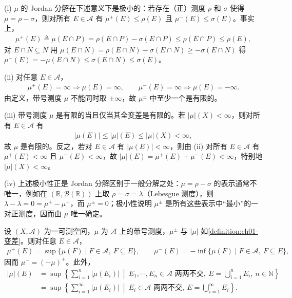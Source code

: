 \documentclass[../../main.tex]{subfiles}%
\begin{document}
\begin{remark}\label{remark:ch01-Jordan性质}\label{remark:ch01-Jordan变差}
(i) $\mu$ 的 Jordan 分解在下述意义下是极小的：若存在（正）测度 $\rho$ 和 $\sigma$ 使得 $\mu=\rho-\sigma$，则对所有 $E\in\mathcal{A}$ 有 $\mu^+(E)\leqslant\rho(E)$ 且 $\mu^-(E)\leqslant\sigma(E)$。事实上，
\begin{align*}
\mu^+(E)\triangleq\mu(E\cap P)=\rho(E\cap P)-\sigma(E\cap P)\leqslant\rho(E\cap P)\leqslant\rho(E),
\end{align*}
对 $E\cap N\subseteq N$ 用 $\mu(E\cap N)=\rho(E\cap N)-\sigma(E\cap N)\geqslant-\sigma(E\cap N)$ 得 $\mu^-(E)=-\mu(E\cap N)\leqslant\sigma(E\cap N)\leqslant\sigma(E)$。

(ii) 对任意 $E\in\mathcal{A}$，
\begin{align*}
\mu^+(E)=\infty\Rightarrow\mu(E)=\infty,\qquad
\mu^-(E)=\infty\Rightarrow\mu(E)=-\infty.
\end{align*}
由定义，带号测度 $\mu$ 不能同时取 $\pm\infty$，故 $\mu^\pm$ 中至少一个是有限的。

(iii) 带号测度 $\mu$ 是有限的当且仅当其全变差是有限的。若 $|\mu|(X)<\infty$，则对所有 $E\in\mathcal{A}$ 有
\begin{align*}
|\mu(E)|\leqslant|\mu|(E)\leqslant|\mu|(X)<\infty,
\end{align*}
故 $\mu$ 是有限的。反之，若对 $E\in\mathcal{A}$ 有 $|\mu(E)|<\infty$，则由 (ii) 对所有 $E\in\mathcal{A}$ 有 $\mu^+(E)<\infty$ 且 $\mu^-(E)<\infty$，故 $|\mu|(E)=\mu^+(E)+\mu^-(E)<\infty$，特别地 $|\mu|(X)<\infty$。

(iv) 上述极小性正是 Jordan 分解区别于一般分解之处：$\mu=\rho-\sigma$ 的表示通常不唯一，例如在 $(\mathbb{R},\mathcal{B}(\mathbb{R}))$ 上取 $\rho=\sigma=\lambda$（Lebesgue 测度），则 $\lambda-\lambda=0=\mu^+-\mu^-$，而 $\mu^\pm=0$；极小性说明 $\mu^\pm$ 是所有这些表示中“最小”的一对正测度，因而由 $\mu$ 唯一确定。
\end{remark}


\begin{proposition}\label{proposition:ch01-变差公式}\label{proposition:ch01-正变差}\label{proposition:ch01-全变差}
设 $(X,\mathcal{A})$ 为一可测空间，$\mu$ 为 $\mathcal{A}$ 上的带号测度，$\mu^\pm$ 与 $|\mu|$ 如\cref{definition:ch01-变差}。则对任意 $E\in\mathcal{A}$，
\begin{align*}
\mu^+(E)=\sup\{\mu(F)\mid F\in\mathcal{A},\ F\subseteq E\},\qquad
\mu^-(E)=-\inf\{\mu(F)\mid F\in\mathcal{A},\ F\subseteq E\},
\end{align*}
因而 $\mu^-=(-\mu)^+$。此外，
\begin{align}
|\mu|(E)&=\sup\left\{\sum_{i=1}^n|\mu(E_i)|\ \middle|\ E_1,\cdots ,E_n\in\mathcal{A}\text{ 两两不交},\ E=\bigcup_{i=1}^n E_i,\ n\in\mathbb{N}\right\} \nonumber\\
&=\sup\left\{\sum_{i=1}^\infty|\mu(E_i)|\ \middle|\ E_i\in\mathcal{A}\text{ 两两不交},\ E=\bigcup_{i=1}^\infty E_i\right\}. \label{align:ch01-全变差公式}
\end{align}
\end{proposition}
\end{document}
